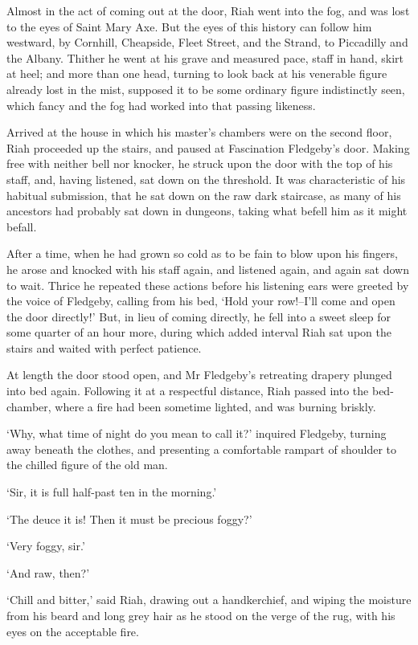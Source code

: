 Almost in the act of coming out at the door, Riah went into the fog, and
was lost to the eyes of Saint Mary Axe. But the eyes of this history
can follow him westward, by Cornhill, Cheapside, Fleet Street, and the
Strand, to Piccadilly and the Albany. Thither he went at his grave and
measured pace, staff in hand, skirt at heel; and more than one head,
turning to look back at his venerable figure already lost in the mist,
supposed it to be some ordinary figure indistinctly seen, which fancy
and the fog had worked into that passing likeness.

Arrived at the house in which his master’s chambers were on the
second floor, Riah proceeded up the stairs, and paused at Fascination
Fledgeby’s door. Making free with neither bell nor knocker, he struck
upon the door with the top of his staff, and, having listened, sat down
on the threshold. It was characteristic of his habitual submission,
that he sat down on the raw dark staircase, as many of his ancestors
had probably sat down in dungeons, taking what befell him as it might
befall.

After a time, when he had grown so cold as to be fain to blow upon his
fingers, he arose and knocked with his staff again, and listened again,
and again sat down to wait. Thrice he repeated these actions before his
listening ears were greeted by the voice of Fledgeby, calling from his
bed, ‘Hold your row!--I’ll come and open the door directly!’ But, in
lieu of coming directly, he fell into a sweet sleep for some quarter of
an hour more, during which added interval Riah sat upon the stairs and
waited with perfect patience.

At length the door stood open, and Mr Fledgeby’s retreating drapery
plunged into bed again. Following it at a respectful distance, Riah
passed into the bed-chamber, where a fire had been sometime lighted, and
was burning briskly.

‘Why, what time of night do you mean to call it?’ inquired Fledgeby,
turning away beneath the clothes, and presenting a comfortable rampart
of shoulder to the chilled figure of the old man.

‘Sir, it is full half-past ten in the morning.’

‘The deuce it is! Then it must be precious foggy?’

‘Very foggy, sir.’

‘And raw, then?’

‘Chill and bitter,’ said Riah, drawing out a handkerchief, and wiping
the moisture from his beard and long grey hair as he stood on the verge
of the rug, with his eyes on the acceptable fire.

